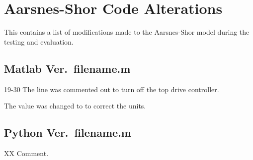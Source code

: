 \chapter{Aarsnes-Shor Code Alterations}
This \appendixname{} contains a list of modifications made to the Aarsnes-Shor model during the testing and evaluation.

\section{Matlab Ver.\ {\codefont filename.m}}
\begin{codemodifications}

\begin{codemodification}{19-30}
The line was commented out to turn off the top drive controller.
\end{codemodification}

\begin{codemodification}{25}%
The value  was changed to  to correct the units.
\end{codemodification}

\begin{codemodification}{29}
\lipsum[1]
\end{codemodification}

\end{codemodifications}

\section{Python Ver.\ {\codefont filename.m}}
\begin{codemodifications}

\begin{codemodification}{XX}
Comment.
\end{codemodification}

\end{codemodifications} 
